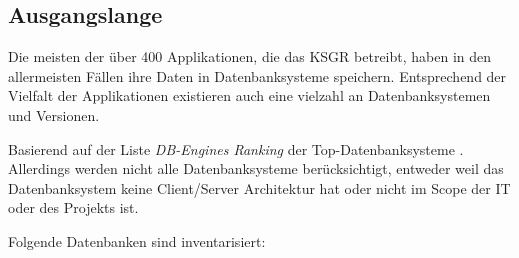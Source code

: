 \subsection{Ausgangslange}
Die meisten der über 400 Applikationen, die das KSGR betreibt, haben in den allermeisten Fällen ihre Daten in Datenbanksysteme speichern.
Entsprechend der Vielfalt der Applikationen existieren auch eine vielzahl an Datenbanksystemen und Versionen.

Basierend auf der Liste \textit{DB-Engines Ranking}\cite{TTVGIG2P} der Top-Datenbanksysteme .
Allerdings werden nicht alle Datenbanksysteme berücksichtigt, entweder weil das Datenbanksystem keine Client/Server Architektur hat oder nicht im Scope der IT oder des Projekts ist.

Folgende Datenbanken sind inventarisiert:
\begin{landscape}
\begin{table}[]
\end{table}
\end{landscape}
